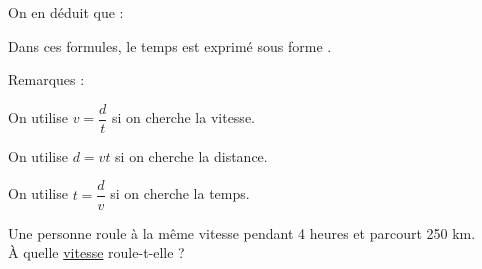 \ifdefined\COMPLETE
\else
    
    
\fi

                 

\begin{labeling}{On en déduit que :} 
\item [On en déduit que :] 
\item [et :]  
\end{labeling}    

\medskip

Dans ces formules, le temps est exprimé sous forme .

\begin{labeling}[$\bullet$]{Remarques : }
\item [\underline{Remarques} : ] On utilise $v=\dfrac{d}{t}$ si on cherche la vitesse.   
\item [] On utilise $d=vt$ si on cherche la distance.   
\item [] On utilise $t=\dfrac{d}{v}$ si on cherche la temps.   
\end{labeling}

\bigskip
                   

                 \centerline{}   

\bigskip                     
                 

\medskip  

Une personne roule à la même vitesse pendant 4 heures et parcourt 250 km.\\
À quelle \underline{vitesse} roule-t-elle ? 

